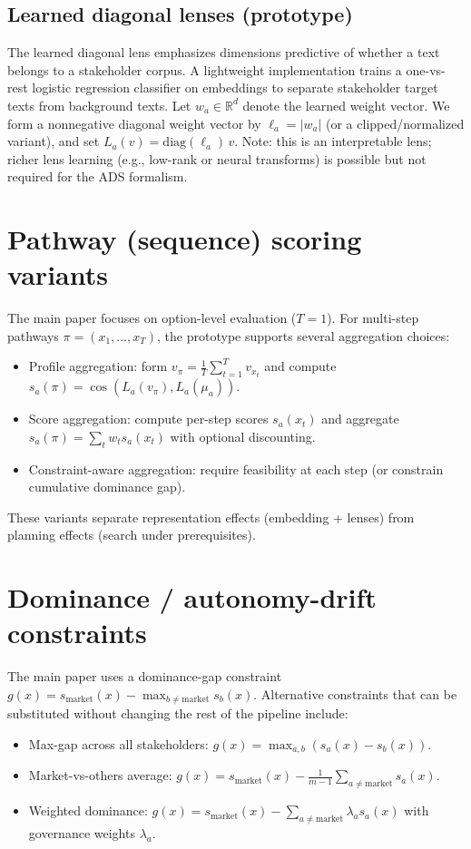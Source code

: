 \documentclass{article}
\begin{document}
\subsection{Learned diagonal lenses (prototype)}
The learned diagonal lens emphasizes dimensions predictive of whether a text belongs to a stakeholder corpus.
A lightweight implementation trains a one-vs-rest logistic regression classifier on embeddings to separate stakeholder target texts from background texts.
Let $w_a\in\mathbb{R}^d$ denote the learned weight vector. We form a nonnegative diagonal weight vector by $\ell_a = |w_a|$ (or a clipped/normalized variant), and set $L_a(v)=\mathrm{diag}(\ell_a)\,v$.
{Note:} this is an interpretable lens; richer lens learning (e.g., low-rank or neural transforms) is possible but not required for the ADS formalism.

\section{Pathway (sequence) scoring variants}
The main paper focuses on option-level evaluation ($T=1$). For multi-step pathways $\pi=(x_1,\dots,x_T)$, the prototype supports several aggregation choices:
\begin{itemize}
  \item {Profile aggregation:} form $v_\pi = \frac{1}{T}\sum_{t=1}^T v_{x_t}$ and compute $s_a(\pi)=\cos(L_a(v_\pi),L_a(\mu_a))$.
  \item {Score aggregation:} compute per-step scores $s_a(x_t)$ and aggregate $s_a(\pi)=\sum_t w_t s_a(x_t)$ with optional discounting.
  \item {Constraint-aware aggregation:} require feasibility at each step (or constrain cumulative dominance gap).
\end{itemize}
These variants separate representation effects (embedding + lenses) from planning effects (search under prerequisites).

\section{Dominance / autonomy-drift constraints}
The main paper uses a dominance-gap constraint $g(x)=s_{\text{market}}(x)-\max_{b\ne \text{market}} s_b(x)$.
Alternative constraints that can be substituted without changing the rest of the pipeline include:
\begin{itemize}
  \item {Max-gap across all stakeholders:} $g(x)=\max_{a,b}(s_a(x)-s_b(x))$.
  \item {Market-vs-others average:} $g(x)=s_{\text{market}}(x)-\frac{1}{m-1}\sum_{a\ne \text{market}} s_a(x)$.
  \item {Weighted dominance:} $g(x)=s_{\text{market}}(x)-\sum_{a\ne \text{market}} \lambda_a s_a(x)$ with governance weights $\lambda_a$.
\end{itemize}
\end{document}
